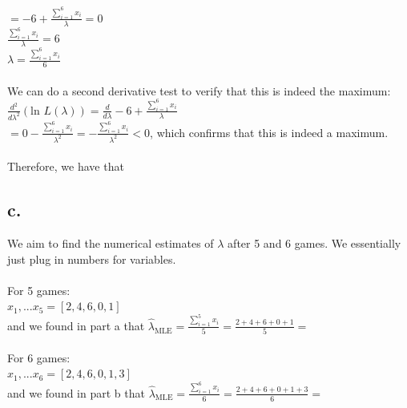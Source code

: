 \documentclass{article}
\newcommand{\1}{\mathbf{1}}
\begin{document}
{$= -6 + \frac{\sum_{i=1}^{6} x_i}{\lambda} = 0$ \\
$\frac{\sum_{i=1}^{6} x_i}{\lambda} = 6$ \\
$\lambda = \frac{\sum_{i=1}^{6} x_i}{6}$ \\ \\
We can do a second derivative test to verify that this is indeed the maximum: \\ 
$\frac{d^2}{d\lambda^2} (\text{ln } L(\lambda)) = \frac{d}{d\lambda} -6 + \frac{\sum_{i=1}^{6} x_i}{\lambda}$ \\
$= 0 - \frac{\sum_{i=1}^{6} x_i}{\lambda^2} = - \frac{\sum_{i=1}^{6} x_i}{\lambda^2} < 0$, which confirms that this is indeed a maximum. \\ \\
Therefore, we have that 

\subsection*{c.}
We aim to find the numerical estimates of $\lambda$ after 5 and 6 games. We essentially just plug in numbers for variables. \\ \\
For 5 games: \\
$x_1, ... x_5 = [2, 4, 6, 0, 1]$ \\
and we found in part a that $\widehat{\lambda}_{\text{MLE}} = \frac{\sum_{i=1}^{5} x_i}{5} = \frac{2 + 4 + 6 + 0 + 1}{5} = $  \\ \\
For 6 games: \\
$x_1, ... x_6 = [2, 4, 6, 0, 1, 3]$ \\
and we found in part b that $\widehat{\lambda}_{\text{MLE}} = \frac{\sum_{i=1}^{6} x_i}{6} = \frac{2 + 4 + 6 + 0 + 1 + 3}{6} = $ 

\newpage

}
\end{document}
